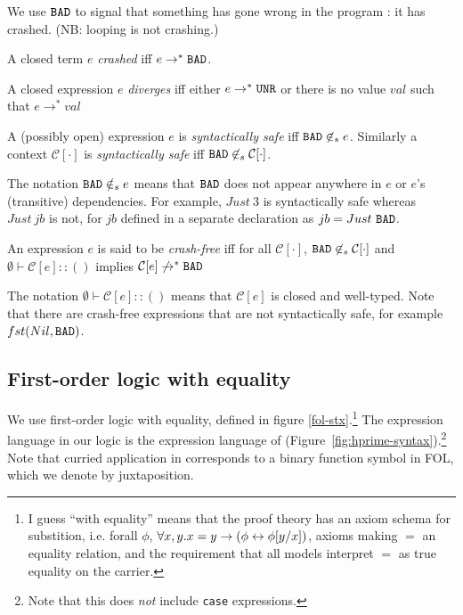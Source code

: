 \documentclass[preprint]{sigplanconf}
\begin{document}
We use $\texttt{BAD}$ to signal that something has gone wrong in the program :
it has crashed. (NB: looping is not crashing.)

\begin{definition}[Crash]
A closed term $e$ \emph{crashed} iff $e \to^* \texttt{BAD}$.
\end{definition}

\begin{definition}[Diverges]
A closed expression $e$ \emph{diverges} iff either $e \to^* \texttt{UNR}$ or there is
no value $val$ such that $e \to^* val$
\end{definition}

\begin{definition}
A (possibly open) expression $e$ is \emph{syntactically safe} iff $\texttt{BAD} \not
\in_s e$. Similarly a context $\mathcal{C}[\cdot]$ is \emph{syntactically safe} iff $\texttt{BAD}
\not \in_s \mathcal{C}[\cdot]$.
\end{definition}

The notation $\texttt{BAD} \notin_s e$ means that $\texttt{BAD}$ does not appear
anywhere in $e$ or $e$'s (transitive) dependencies.  For
example, $Just ~3$ is syntactically safe whereas $Just ~jb$ is 
not, for $jb$ defined in a separate declaration as $jb = Just~\texttt{BAD}$.

\begin{definition}\label{def:cf}
An expression $e$ is said to be \emph{crash-free} iff 
for all $\mathcal{C}[\cdot]$, $\texttt{BAD} \not \in_s \mathcal{C}[\cdot]$ and $\emptyset \vdash
\mathcal{C}[e] :: ()$ implies $\mathcal{C}[e] \not \to^* \texttt{BAD}$
\end{definition}
The notation $\emptyset \vdash \mathcal{C}[e] :: ()$ means that
$\mathcal{C}[e]$ is closed and well-typed.  Note
that there are crash-free expressions that are not syntactically safe,
for example $fst(Nil,\texttt{BAD})$.


\subsection{First-order logic with equality}
We use first-order logic with equality, defined in figure \ref{fol-stx}.\footnote{
%
I guess ``with equality'' means that the proof theory has an axiom schema for substition, i.e. forall $\phi$, $\forall x,y.x=y \to (\phi \leftrightarrow \phi[y/x])$, axioms making $=$ an equality relation, and the requirement that all models interpret $=$ as true equality on the carrier.
%
}
The expression language in our logic is the expression language of 
\hprime (Figure~\ref{fig:hprime-syntax}).\footnote{
  Note that this does \emph{not} include \texttt{case} expressions.
}  Note that curried application in \hprime
corresponds to a binary function symbol in FOL, which we denote by juxtaposition.
\end{document}
